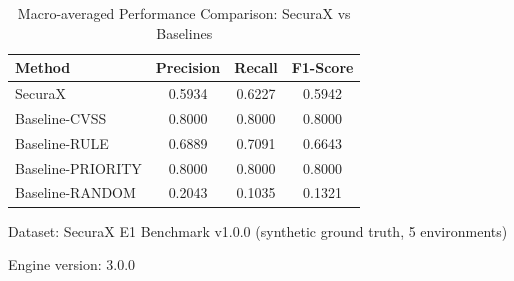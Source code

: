 \begin{table}[htbp]
\centering
\caption{Macro-averaged Performance Comparison: SecuraX vs Baselines}
\label{tab:macro_comparison}
\begin{tabular}{lccc}
\hline
\textbf{Method} & \textbf{Precision} & \textbf{Recall} & \textbf{F1-Score} \\
\hline
SecuraX & 0.5934 & 0.6227 & 0.5942 \\
Baseline-CVSS & 0.8000 & 0.8000 & 0.8000 \\
Baseline-RULE & 0.6889 & 0.7091 & 0.6643 \\
Baseline-PRIORITY & 0.8000 & 0.8000 & 0.8000 \\
Baseline-RANDOM & 0.2043 & 0.1035 & 0.1321 \\
\hline
\end{tabular}
\begin{tablenotes}
\small
\item Dataset: SecuraX E1 Benchmark v1.0.0 (synthetic ground truth, 5 environments)
\item Engine version: 3.0.0
\end{tablenotes}
\end{table}